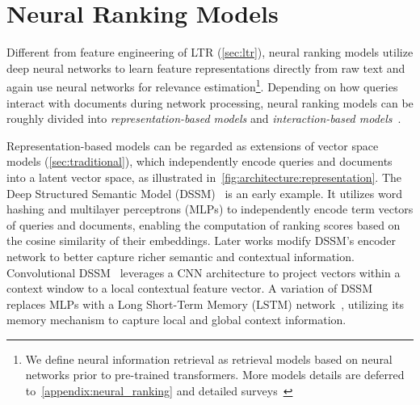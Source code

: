 
\section{Neural Ranking Models}
\label{sec:neural_ranking}


Different from feature engineering of LTR (\cref{sec:ltr}), neural ranking models utilize deep neural networks to learn feature representations directly from raw text and again use neural networks for relevance estimation\footnote{We define neural information retrieval as retrieval models based on neural networks prior to pre-trained transformers. More models details are deferred to~\cref{appendix:neural_ranking} and detailed surveys~\cite{onal2018neural,mitra2018introduction,xu2018deep}}. 
Depending on how queries interact with documents during network processing, neural ranking models can be roughly divided into \textit{representation-based models} and \textit{interaction-based models}~\citep{guo2016deep}.


Representation-based models can be regarded as extensions of vector space models (\cref{sec:traditional}), which independently encode queries and documents into a latent vector space, as illustrated in~\cref{fig:architecture:representation}.
The Deep Structured Semantic Model (\textsc{DSSM})~\citep{huang2013dssm} is an early example. 
It utilizes word hashing and multilayer perceptrons (MLPs) to independently encode term vectors of queries and documents, enabling the computation of ranking scores based on the cosine similarity of their embeddings. 
Later works modify \textsc{DSSM}'s encoder network to better capture richer semantic and contextual information. Convolutional \textsc{DSSM}~\citep{shen2014cdssm} leverages a CNN architecture to project vectors within a context window to a local contextual feature vector. 
A variation of \textsc{DSSM} replaces MLPs with a Long Short-Term Memory (LSTM) network~\citep{hochreiter1997long,palangi2016deep,wan2016deep}, utilizing its memory mechanism to capture local and global context information.


